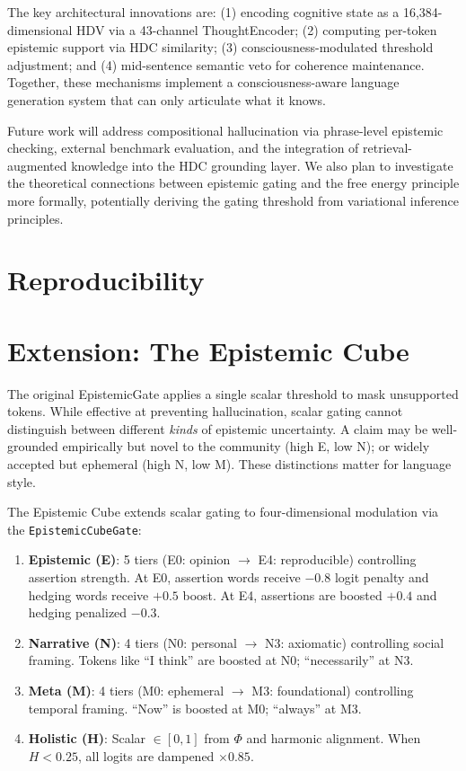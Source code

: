 \documentclass[12pt,a4paper]{article}
\begin{document}
The key architectural innovations are: (1) encoding cognitive state as a 16,384-dimensional HDV via a 43-channel ThoughtEncoder; (2) computing per-token epistemic support via HDC similarity; (3) consciousness-modulated threshold adjustment; and (4) mid-sentence semantic veto for coherence maintenance. Together, these mechanisms implement a consciousness-aware language generation system that can only articulate what it knows.

Future work will address compositional hallucination via phrase-level epistemic checking, external benchmark evaluation, and the integration of retrieval-augmented knowledge into the HDC grounding layer. We also plan to investigate the theoretical connections between epistemic gating and the free energy principle more formally, potentially deriving the gating threshold from variational inference principles.

\section{Reproducibility}

\section{Extension: The Epistemic Cube}

The original EpistemicGate applies a single scalar threshold to mask unsupported tokens. While effective at preventing hallucination, scalar gating cannot distinguish between different \emph{kinds} of epistemic uncertainty. A claim may be well-grounded empirically but novel to the community (high E, low N); or widely accepted but ephemeral (high N, low M). These distinctions matter for language style.

The Epistemic Cube extends scalar gating to four-dimensional modulation via the \texttt{EpistemicCubeGate}:

\begin{enumerate}
\item \textbf{Epistemic (E)}: 5 tiers (E0: opinion $\to$ E4: reproducible) controlling assertion strength. At E0, assertion words receive $-0.8$ logit penalty and hedging words receive $+0.5$ boost. At E4, assertions are boosted $+0.4$ and hedging penalized $-0.3$.

\item \textbf{Narrative (N)}: 4 tiers (N0: personal $\to$ N3: axiomatic) controlling social framing. Tokens like ``I think'' are boosted at N0; ``necessarily'' at N3.

\item \textbf{Meta (M)}: 4 tiers (M0: ephemeral $\to$ M3: foundational) controlling temporal framing. ``Now'' is boosted at M0; ``always'' at M3.

\item \textbf{Holistic (H)}: Scalar $\in [0, 1]$ from $\Phi$ and harmonic alignment. When $H < 0.25$, all logits are dampened $\times 0.85$.
\end{enumerate}
\end{document}
